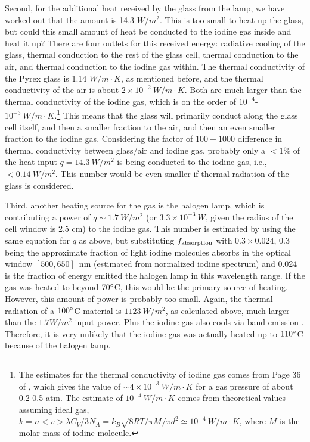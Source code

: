 Second, for the additional heat received by the glass from the lamp,
we have worked out that the amount is 14.3 $W/m^2$. This is too small
to heat up the glass, but could this small amount of heat be conducted
to the iodine gas inside and heat it up? There are four outlets for
this received energy: radiative cooling of the glass, thermal
conduction to the rest of the glass cell, thermal conduction to the
air, and thermal conduction to the iodine gas within. The thermal
conductivity of the Pyrex glass is 1.14 $W/m\cdot K$, as mentioned
before, and the thermal conductivity of the air is about $2 \times 10
^{-2}\ W/m\cdot K$. Both are much larger than the thermal conductivity
of the iodine gas, which is on the order of $10^{-4}$-$10^{-3}\
W/m\cdot K$.\footnote{The estimates for the thermal conductivity of
iodine gas comes from Page 36 of \cite{vargaftik1993handbook}, which
gives the value of $\sim 4\times10^{-3}\ W/m\cdot K$ for a gas
pressure of about 0.2-0.5 atm. The estimate of $10^{-4}\ W/m\cdot K$
comes from theoretical values assuming ideal gas, $k=n<v>\lambda
C_V/3N_A=k_B\sqrt{8RT/\pi M}/\pi d^2 \simeq 10^{-4}\ W/m\cdot K$,
where $M$ is the molar mass of iodine molecule.} This means that the
glass will primarily conduct along the glass cell itself, and then a
smaller fraction to the air, and then an even smaller fraction to the
iodine gas. Considering the factor of $100-1000$ difference in thermal
conductivity between glass/air and iodine gas, probably only a $< 1$\%
of the heat input $q=14.3\ W/m^2$ is being conducted to the iodine
gas, i.e., $< 0.14\ W/m^2$. This number would be even smaller if
thermal radiation of the glass is considered.

Third, another heating source for the gas is the halogen lamp, which
is contributing a power of $q \sim 1.7\ W/m^2$ (or $3.3 \times
10^{-3}\ W$, given the radius of the cell window is 2.5 cm) to the
iodine gas. This number is estimated by using the same equation for
$q$ as above, but substituting $f_{\rm absorption}$ with $0.3 \times
0.024$, 0.3 being the approximate fraction of light iodine molecules
absorbs in the optical window $[500,650]$~nm (estimated from
normalized iodine spectrum) and 0.024 is the fraction of energy
emitted the halogen lamp in this wavelength range. If the gas was
heated to beyond $70^{\circ}$C, this would be the primary source of
heating. However, this amount of power is probably too small. Again,
the thermal radiation of a $100^{\circ}$C material is $1123\ W/m^2$, as
calculated above, much larger than the $1.7 W/m^2$ input power. Plus
the iodine gas also cools via band emission
\citep{waser1947emission}. Therefore, it is very unlikely that the
iodine gas was actually heated up to $110^{\circ}$C because of the
halogen lamp.

